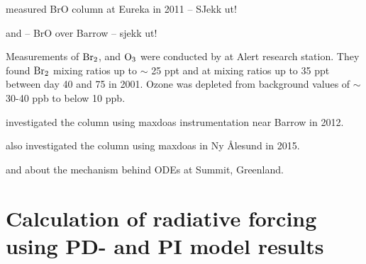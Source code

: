 \cite{Zhao2016} measured BrO column at Eureka in 2011 -- SJekk ut! 


\cite{Peterson2016} and \cite{Peterson2015} -- BrO over Barrow -- sjekk ut! 

Measurements of $\mathrm{Br_2}$,  and $\mathrm{O_3}$ were conducted by \cite{Foster2001} at Alert research station. They found $\mathrm{Br_2}$ mixing ratios up to $\sim$ 25 \acrshort{ppt} and  at mixing ratios up to 35 \acrshort{ppt} between day 40 and 75 in 2001. Ozone was depleted from background values of $\sim$ 30-40 \acrshort{ppb} to below 10 ppb. 

\medskip

\cite{Simpson2017} investigated the  column using \acrlong{maxdoas} instrumentation near Barrow in 2012.

\medskip

\cite{Luo2018} also investigated the  column using \acrshort{maxdoas} in Ny Ålesund in 2015. 

\medskip

\cite{Thomas2012} and \cite{Thomas2011} about the mechanism behind ODEs at Summit, Greenland. 

\section{Calculation of radiative forcing using PD- and PI model results}